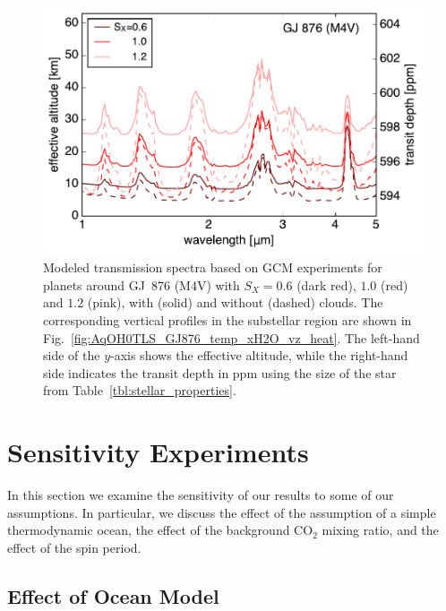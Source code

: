 \documentclass[11pt,numberedappendix,twocolappendix,]{emulateapj}
\newcommand{\yf}[1]{{\color{orange}#1}}
\begin{document}
\begin{figure}[!h]
    \begin{center}
    \includegraphics[width=\hsize]{transit_GJ876.pdf}
    \end{center}
\caption{Modeled transmission spectra based on GCM experiments for planets around GJ~876 (M4V) with $S_X=0.6$ (dark red), $1.0$ (red) and $1.2$ (pink), with (solid) and without (dashed) clouds. The corresponding vertical profiles in the substellar region are shown in Fig.~\ref{fig:AqOH0TLS_GJ876_temp_xH2O_vz_heat}. The left-hand side of the $y$-axis shows the effective altitude, while the right-hand side indicates the transit depth in ppm using the size of the star from Table~\ref{tbl:stellar_properties}.}
\label{fig:transmission}
\end{figure}


\section{Sensitivity \yf{Experiments} }
\label{s:sensitivity}

In this section we examine the sensitivity of our results to some of our assumptions. 
In particular, we discuss the effect of the assumption of a simple thermodynamic ocean, the effect of the background CO$_2$ mixing ratio, and the effect of the spin period. 


\subsection{Effect of Ocean Model}
\label{ss:sensitivity_ocean}
\end{document}
